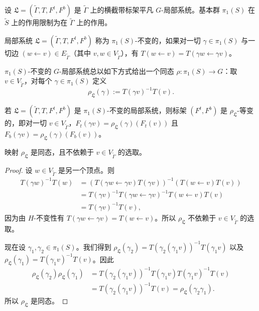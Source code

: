 设 $\mathfrak{L}=(\tilde\Gamma,T,F^{t},F^{b})$ 是 $\tilde\Gamma$ 上的横截带标架平凡 $G$-局部系统。基本群 $\pi_1(S)$ 在 $\tilde S$ 上的作用限制为在 $\tilde\Gamma$ 上的作用。

\begin{definition}[11.34]
局部系统 $\mathfrak{L}=(\tilde\Gamma,T,F^{t},F^{b})$ 称为 $\pi_1(S)$-不变的，如果对一切 $\gamma\in\pi_1(S)$ 与一切边 $(w\leftarrow v)\in E_{\tilde\Gamma}$（其中 $v,w\in V_{\tilde\Gamma}$），有 $T(w\leftarrow v)=T(\gamma w\leftarrow\gamma v)$。
\end{definition}

$\pi_1(S)$-不变的 $G$-局部系统总以如下方式给出一个同态 $\rho\colon\pi_1(S)\to G$：取 $v\in V_{\tilde\Gamma}$，对每个 $\gamma\in\pi_1(S)$ 定义
\begin{equation}
\rho_{\mathfrak{L}}(\gamma):=T(\gamma v)^{-1}T(v). \tag{11.2}
\end{equation}

\begin{remark}[11.35]
若 $\mathfrak{L}=(\tilde\Gamma,T,F^{t},F^{b})$ 是 $\pi_1(S)$-不变的局部系统，则标架 $(F^{t},F^{b})$ 是 $\rho_{\mathfrak{L}}$-等变的，即对一切 $v\in V_{\tilde\Gamma}$，$F_t(\gamma v)=\rho_{\mathfrak{L}}(\gamma)(F_t(v))$ 且 $F_b(\gamma v)=\rho_{\mathfrak{L}}(\gamma)(F_b(v))$。
\end{remark}

\begin{proposition}[11.36]
映射 $\rho_{\mathfrak{L}}$ 是同态，且不依赖于 $v\in V_{\tilde\Gamma}$ 的选取。
\end{proposition}

\begin{proof}
设 $w\in V_{\tilde\Gamma}$ 是另一个顶点。则
\begin{align*}
T(\gamma w)^{-1}T(w)&=\left(T(\gamma w\leftarrow\gamma v)T(\gamma v)\right)^{-1}\left(T(w\leftarrow v)T(v)\right)\\
&=T(\gamma v)^{-1}T(\gamma w\leftarrow\gamma v)^{-1}T(w\leftarrow v)T(v)\\
&=T(\gamma v)^{-1}T(v),
\end{align*}
因为由 $H$-不变性有 $T(\gamma w\leftarrow\gamma v)=T(w\leftarrow v)$。所以 $\rho_{\mathfrak{L}}$ 不依赖于 $v\in V_{\tilde\Gamma}$ 的选取。

现在设 $\gamma_1,\gamma_2\in\pi_1(S)$。我们得到 $\rho_{\mathfrak{L}}(\gamma_2)=T(\gamma_2(\gamma_1 v))^{-1}T(\gamma_1 v)$ 以及 $\rho_{\mathfrak{L}}(\gamma_1)=T(\gamma_1 v)^{-1}T(v)$。因此
\begin{align*}
\rho_{\mathfrak{L}}(\gamma_2)\rho_{\mathfrak{L}}(\gamma_1)
&=T(\gamma_2(\gamma_1 v))^{-1}T(\gamma_1 v)T(\gamma_1 v)^{-1}T(v)\\
&=T(\gamma_2(\gamma_1 v))^{-1}T(v)=\rho_{\mathfrak{L}}(\gamma_2\gamma_1).
\end{align*}
所以 $\rho_{\mathfrak{L}}$ 是同态。
\end{proof}


